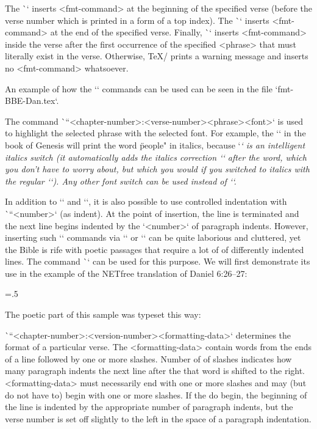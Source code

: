 {%
The \`\fmtpre`  inserts <fmt-command>
at the beginning of the specified verse (before the verse number which is printed in a form 
of a top index). 
The \`\fmtadd`  inserts <fmt-command> at the end of the specified verse.
Finally, \`\fmtins` inserts <fmt-command> inside the verse after the first occurrence of the 
specified <phrase> that must literally exist in the verse. Otherwise, \TeX/ prints a warning 
message and inserts no <fmt-command> whatsoever.

An example of how the `\fmt*` commands can be used can be seen in the file
`fmt-BBE-Dan.tex`.

The command \`\fmtfont``{<chapter-number>:<verse-number>}{<phrase>}{<font>}`
is used to highlight the selected phrase with the selected font.
For example, the `` in the book of Genesis will print the word
\"people"  in italics, because `\em` is an intelligent italics switch (it automatically adds the italics correction `\/` after the word, which you don't have to worry about, but which you would if you switched to italics with the regular `\it`).
Any other font switch can be used instead of `\em`.

In addition to `\begcenter` and `\endcenter`, it is also possible to use controlled 
indentation with \`\ind``<number>` (as indent). 
At the point of insertion, the line is terminated and the next line begins indented by the
`<number>` of paragraph indents. However, inserting such `\ind` commands
via `\fmtins` or `\fmtpre` can be quite laborious and
cluttered, yet the Bible is rife with poetic passages that require a lot of
of differently indented lines. The command \`\fmtpoetry` can be used for this purpose.
We will first demonstrate its use in the example of the NETfree translation of 
Daniel 6:26--27:

\medskip
\picw=.5\hsize
\centerline{ }
\vskip-2pt %



The poetic part of this sample was typeset this way:
\begtt
{}
\endtt








\`\fmtpoetry``{<chapter-number>:<version-number>}{<formatting-data>}` determines the 
format of a particular verse. The <formatting-data>
contain words from the ends of a line followed by one or more slashes. Number of
of slashes indicates how many paragraph indents the next line after the
that word is shifted to the right. <formatting-data> must necessarily end with one or more
slashes and may (but do not have to) begin with one or more slashes.  If
the do begin, the beginning of the line is indented by the appropriate number of paragraph indents,
but the verse number is set off slightly to the left in the space of a paragraph
indentation.

}
